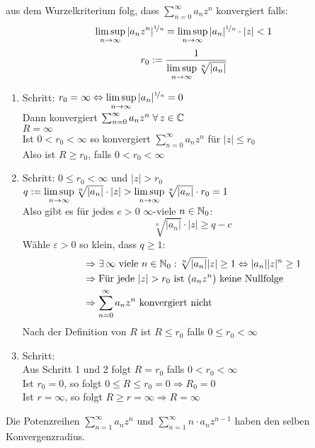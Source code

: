\documentclass[../ana1u.tex]{subfiles}
\begin{document}
\begin{bew}
	aus dem Wurzelkriterium folg, dass \( \sum_{n=0}^{\infty} a_n z^n\) konvergiert falls:
	\[\limsup\limits_{n\rightarrow\infty} |a_n z^n|^{\nicefrac{1}{n}} = \limsup\limits_{n\rightarrow\infty} |a_n|^{\nicefrac{1}{n}}  \cdot |z| < 1 \]
	\[r_0 := \frac{1}{\limsup\limits_{n\rightarrow\infty}\sqrt[n]{|a_n|}} \]
	\begin{enumerate}
		\item Schritt: \(r_0 = \infty \Leftrightarrow \limsup\limits_{n\rightarrow\infty} |a_n|^{\nicefrac{1}{n}} = 0 \)\\
			Dann konvergiert \(\sum_{n=0}^{\infty} a_n z^n \; \forall \, z \in \mathbb{C} \)\\
			\(R = \infty\)\\
			Ist \(0 < r_0 < \infty \) so konvergiert \(\sum_{n=0}^{\infty} a_n z^n \) für \(|z| \leq r_0 \)\\
			Also ist \(R \geq r_0\), falls \(0 < r_0 < \infty\)
		\item Schritt: \(0 \leq r_0 < \infty \) und \(|z| > r_0 \)\\
			\(q := \limsup\limits_{n\rightarrow\infty}\sqrt[n]{|a_n|} \cdot |z| > \limsup\limits_{n\rightarrow\infty}\sqrt[n]{|a_n|} \cdot r_0 = 1 \)\\
			Also gibt es für jedes \(e > 0\) \(\infty\)-viele \(n \in \mathbb{N}_0\):\\
			\[\sqrt[n]{|a_n|} \cdot |z| \geq q - c \]
			Wähle \(\varepsilon > 0 \) so klein, dass \(q \geq 1\):
			\begin{align*}
				&\Rightarrow \exists \, \infty \text{ viele } n \in \mathbb{N}_0: \sqrt[n]{|a_n|}|z| \geq 1 \Leftrightarrow |a_n||z|^n \geq 1\\
				&\Rightarrow \text{Für jede } |z| > r_0 \text{ ist } (a_n z^n) \text{ keine Nullfolge}\\
				&\Rightarrow \sum_{n=0}^{\infty} a_n z^n \text{ konvergiert nicht}
			\end{align*}
			Nach der Definition von \(R\) ist \(R \leq r_0\) falls \(0 \leq r_0 < \infty\)
		\item Schritt:\\
		Aus Schritt 1 und 2 folgt \(R = r_0\) falls \(0 < r_0 < \infty\)\\
		Ist \(r_0 = 0 \), so folgt \(0 \leq R \leq r_0 = 0 \Rightarrow R_0 = 0 \)\\
		Ist \(r = \infty \), so folgt \(R \geq r = \infty \Rightarrow R = \infty \)
	\end{enumerate}	
\end{bew}
\begin{kor}
	Die Potenzreihen \(\sum_{n=1}^{\infty} a_n z^n \) und \(\sum_{n=1}^{\infty} n \cdot a_n z^{n-1} \) haben den selben Konvergenzradius.
\end{kor}
\end{document}
